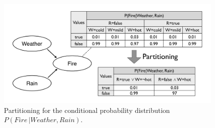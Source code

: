 



 \begin{figure}[h]
\centering
\includegraphics[scale=0.25]{imgs/partitioning.pdf}
\caption{Partitioning for the conditional probability distribution $P(\mathit{Fire} \, | \mathit{Weather}, \mathit{Rain})$.}
\label{fig:partitioning}
\end{figure}

